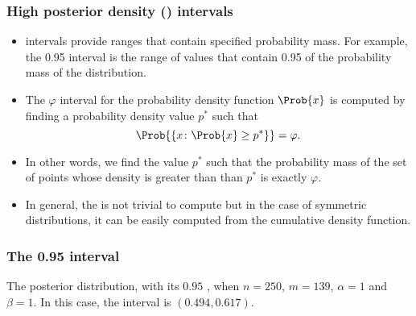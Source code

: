 \documentclass{slides}
\begin{document}
\begin{frame}
	\frametitle{High posterior density (\hpd) intervals}
	\begin{itemize}
		\item \hpd intervals provide ranges that contain specified probability mass. For example, the 0.95 \hpd interval is the range of values that contain 0.95 of the probability mass of the distribution.
		\item The $\varphi$ \hpd interval for the probability density function $\Prob{x}$ is computed by finding a probability density value $p^*$ such that 
		\[
			\Prob{\{x \colon \Prob{x} \geq p^*\}} = \varphi.
		\]
		\item In other words, we find the value $p^*$ such that the probability mass of the set of points whose density is greater than than $p^*$ is exactly $\varphi$. 
		\item In general, the \hpd is not trivial to compute but in the case of symmetric distributions, it can be easily computed from the cumulative density function.
	\end{itemize}
\end{frame}

\begin{frame}
	\frametitle{The 0.95 \hpd interval}
	
	The posterior distribution, with its $0.95$ \hpd, when $n=250$, $m=139$, $\alpha=1$ and $\beta=1$. In this case, the \hpd interval is $(0.494, 0.617)$.
\end{frame}
\end{document}

